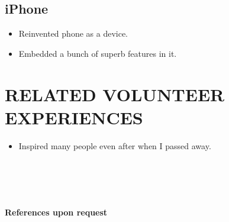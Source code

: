 \documentclass{ziba_resume}
\begin{document}
\subsection{iPhone}
\begin{itemize}
    \item Reinvented phone as a device.
    \item Embedded a bunch of superb features in it.
\end{itemize}

\section{RELATED VOLUNTEER EXPERIENCES}

\begin{itemize}
    \item Inspired many people even after when I passed away.
\end{itemize}

\\\\
\section{ } %
\textbf{\text{*}} \textbf{References upon request}
\end{document}
